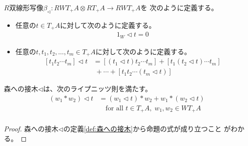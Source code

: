 		\begin{definition}[森への接木]\label{def:森への接木} %
			$R$双線形写像$\beta_\lhd: RWT_+A\otimes RT_+A\to RWT_+A$を
			次のように定義する。
			\begin{itemize}\setlength{\itemsep}{-1mm} %
				\item 任意の$t\in T_+A$に対して次のように定義する。
				\begin{equation*}\begin{split} %
					1_W\lhd t = 0
				\end{split}\end{equation*} %
				\item 任意の$t,t_1,t_2,\dots,t_m\in T_+A$に対して次のように定義する。
				\begin{equation*}\begin{split} %
					[t_1t_2\cdots t_m]\lhd t 
					&= [(t_1\lhd t)t_2\cdots t_m] + [t_1(t_2\lhd t)\cdots t_m] \\
					&\;+ \cdots + [t_1t_2\cdots (t_m\lhd t)]
				\end{split}\end{equation*} %
			\end{itemize} %
		\end{definition} %

		\begin{proposition}[森への接木のライプニッツ性]\label{prop:森への接木のライプニッツ性} %
			森への接木$\lhd$は、次のライプニッツ則を満たす。
			\begin{equation*}\begin{split} %
				(w_1*w_2)\lhd t &= (w_1\lhd t)*w_2 + w_1*(w_2\lhd t) \\
				&\quad\text{for all }t\in T_+A,\;w_1,w_2\in WT_+A \\
			\end{split}\end{equation*} %
		\end{proposition} %
		\begin{proof} %
			森への接木$\lhd$の定義\ref{def:森への接木}から命題の式が成り立つこと
			がわかる。
		\end{proof} %

